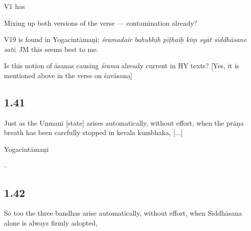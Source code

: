 \begin{ekdosis}
\begin{philcomm}

V1 has

\begin{versinnote}
\end{versinnote}

Mixing up both versions of the verse — contamination already?

V19 is found in Yogacintāmaṇi: \emph{śramadair bahubhịh pīṭhaiḥ kiṃ syāt siddhāsane sati}; JM this seems best to me.

Is this notion of āsanas causing \emph{śrama} already current in HY texts?
[Yes, it is mentioned above in the verse on śavāsana]
\end{philcomm}


\subsection*{1.41}
\begin{translation}[hp01_041]
Just as the Unmanī [state] arises automatically, without effort, when the prāṇa breath has been carefully stopped in kevala kumbhaka, [...]
\end{translation}

\begin{sources}[hp01_041]
\end{sources}

\begin{testimonia}[hp01_041]
Yogacintāmaṇi

\begin{versinnote}
\end{versinnote}

\end{testimonia}

\begin{philcomm}[hp01_041]
--
\end{philcomm}

\subsection*{1.42}
\begin{translation}[hp01_042]
So too the three bandhas arise automatically, without effort, when Siddhāsana alone is always firmly adopted,
\end{translation}


\end{ekdosis}
